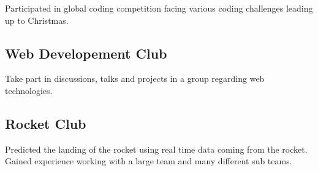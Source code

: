 \documentclass{article}
\begin{document}
Participated in global coding competition facing various coding challenges
leading up to Christmas.

\subsection{Web Developement Club}

Take part in discussions, talks and projects in a group regarding web 
technologies.

\subsection{Rocket Club}

Predicted the landing of the rocket using real time data coming from the rocket. 
Gained experience working with a large team and many different sub teams.
\end{document}
